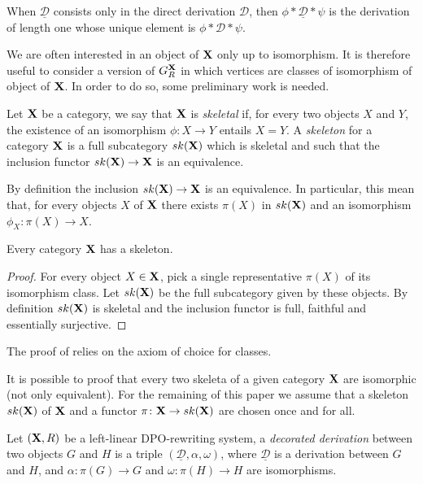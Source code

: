 \documentclass[a4paper,UKenglish,cleveref,pdftex, thm-restate,numberwithinsect]{lipics}
\def\R{\mathsf{R}}
\def\X{\textbf {\textup{X}}}
\newcommand{\ske}{\mathsf{sk}(\X)}
\newcommand{\dder}[1]{\mathscr{#1}}
\newcommand{\der}[1]{\underline{\dder{#1}}}
\def\gpo{\mathsf{G}^{\X}_R}
\begin{document}
\begin{remark}
When $\der{D}$ consists only in the direct derivation $\dder{D}$, then $\phi*\der{D}*\psi$ is the derivation of length one whose unique element is $\phi*\dder{D}*\psi$.
\end{remark}

We are often interested in an object of $\X$ only up to isomorphism. It is therefore useful to consider a version of $\gpo$ in which vertices are classes of isomorphism of object of $\X$. In order to do so, some preliminary work is needed.

\begin{definition}\cite{mac2013categories}
Let $\X$ be a category, we say that  $\X$ is \emph{skeletal} if, for every two objects $X$ and $Y$, the existence of an isomorphism $\phi\colon X\to Y$ entails $X=Y$. A \emph{skeleton} for a category $\X$ is a full subcategory $\ske$ which is skeletal and such that the inclusion functor $\ske\to \X$ is an equivalence. 
\end{definition}

\begin{remark}
By definition the inclusion $\ske \to \X$ is an equivalence. In particular, this mean that, for every objects $X$ of $\X$ there exists $\pi(X)$ in $\ske$ and an isomorphism $\phi_X\colon \pi(X) \to X$.
\end{remark}

\begin{proposition}\label{prop:ske}
	Every category $\X$ has a skeleton. 
\end{proposition}
\begin{proof}
	For every object $X\in \X$, pick a single representative $\pi(X)$ of its isomorphism class. Let $\ske$ be the full subcategory given by these objects. By definition $\ske$ is skeletal and the inclusion functor is full, faithful and essentially surjective.\qedhere 
\end{proof}
\begin{remark}
	The proof of  relies on the axiom of choice for classes.
	\end{remark}
\begin{remark}
	It is possible to proof that every two skeleta of a given category $\X$ are isomorphic (not only equivalent). For the remaining of this paper we assume that a skeleton $\ske$ of $\X$ and a functor $\pi\colon \X\to \ske$ are chosen once and for all.
\end{remark}

\begin{definition}
	Let $(\X, \R)$ be a left-linear DPO-rewriting system, a \emph{decorated derivation} between two objects $G$ and $H$ is a triple $(\der{D}, \alpha, \omega)$, where $\der{D}$ is a derivation between $G$ and $H$, and $\alpha\colon \pi(G)\to G$ and $\omega\colon \pi(H)\to H$ are isomorphisms.
\end{definition}
\end{document}
